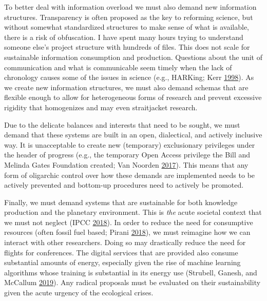 \documentclass[a5paper]{book}
\begin{document}
To better deal with information overload we must also demand new
information structures. Transparency is often proposed as the key to
reforming science, but without somewhat standardized structures to make
sense of what is available, there is a risk of obfuscation. I have spent
many hours trying to understand someone else's project structure with
hundreds of files. This does not scale for sustainable information
consumption and production. Questions about the unit of communication
and what is communicable seem timely when the lack of chronology causes
some of the issues in science (e.g., HARKing; Kerr
\protect\hyperlink{ref-doi:10.1207ux2fs15327957pspr0203_4}{1998}). As we
create new information structures, we must also demand schemas that are
flexible enough to allow for heterogeneous forms of research and prevent
excessive rigidity that homogenizes and may even straitjacket research.

Due to the delicate balances and interests that need to be sought, we
must demand that these systems are built in an open, dialectical, and
actively inclusive way. It is unacceptable to create new (temporary)
exclusionary privileges under the header of progress (e.g., the
temporary Open Access privilege the Bill and Melinda Gates Foundation
created; Van Noorden
\protect\hyperlink{ref-doi:10.1038ux2fnature.2017.21486}{2017}). This
means that any form of oligarchic control over how these demands are
implemented needs to be actively prevented and bottom-up procedures need
to actively be promoted.

Finally, we must demand systems that are sustainable for both knowledge
production and the planetary environment. This is \emph{the} acute
societal context that we must not neglect (IPCC
\protect\hyperlink{ref-ipccGlobalWarmingIPCC2018}{2018}). In order to
reduce the need for consumptive resources (often fossil fuel based;
Pirani \protect\hyperlink{ref-isbn:9780745335612}{2018}), we must
reimagine how we can interact with other researchers. Doing so may
drastically reduce the need for flights for conferences. The digital
services that are provided also consume substantial amounts of energy,
especially given the rise of machine learning algorithms whose training
is substantial in its energy use (Strubell, Ganesh, and McCallum
\protect\hyperlink{ref-DBLP:journalsux2fcorrux2fabs-1906-02243}{2019}).
Any radical proposals must be evaluated on their sustainability given
the acute urgency of the ecological crises.
\end{document}
